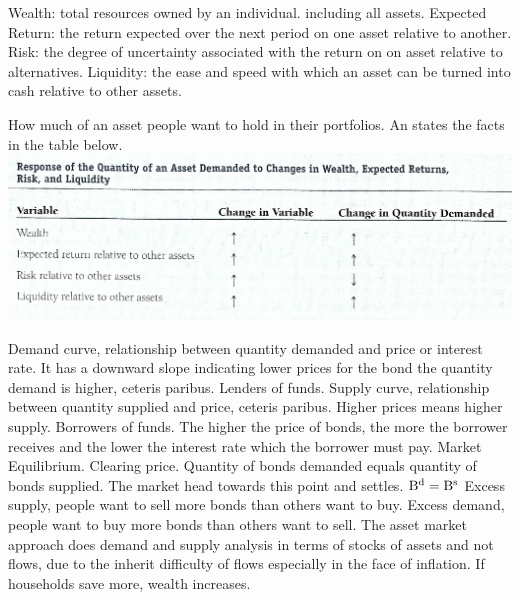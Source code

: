 \documentclass[12pt]{examnotes}
\begin{document}
\ra Wealth: total resources owned by an individual. including all assets.
\ra Expected Return: the return expected over the next period on one asset relative to another.
\ra Risk: the degree of uncertainty associated with the return on on asset relative to alternatives.
\ra Liquidity: the ease and speed with which an asset can be turned into cash relative to other assets.

\ra How much of an asset people want to hold in their portfolios. An states the facts in the table below. 
\vspace{6pt}
\includegraphics[scale=0.5]{./imgs/5t1.jpg}


\ra  Demand curve, relationship between quantity demanded and price or interest rate. It has a downward slope indicating lower prices for the bond the quantity demand is higher, ceteris paribus. Lenders of funds.
\ra Supply curve, relationship between quantity supplied and price, ceteris paribus. Higher prices means higher supply. Borrowers of funds. The higher the price of bonds, the more the borrower receives and the lower the interest rate which the borrower must pay.
\ra Market Equilibrium. Clearing price. Quantity of bonds demanded equals quantity of bonds supplied. The market head towards this point and settles. $\rm{B^d}=\rm{B^s}$
\ra Excess supply, people want to sell more bonds than others want to buy. 
\ra Excess demand, people want to buy more bonds than others want to sell. 
\ra The asset market approach does demand and supply analysis in terms of stocks of assets and not flows, due to the inherit difficulty of flows especially in the face of inflation.
\ra If households save more, wealth increases.
\end{document}
